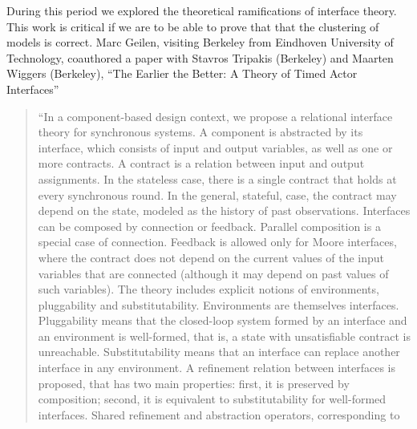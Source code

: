                During this period we explored the theoretical
               ramifications of interface theory.  This work is
               critical if we are to be able to prove that that the
               clustering of models is correct.  Marc Geilen, visiting
               Berkeley from Eindhoven University of Technology,
               coauthored a paper with Stavros Tripakis (Berkeley) and
               Maarten Wiggers (Berkeley), ``The Earlier the Better: A
               Theory of Timed Actor Interfaces''
               \cite{GeilenTripakisWiggers11_EarlierBetterTheoryOfTimedActorInterfaces}

               \begin{quotation}
                 ``In a component-based design context, we propose a
                 relational interface theory for synchronous systems. A
                 component is abstracted by its interface, which
                 consists of input and output variables, as well as one
                 or more contracts. A contract is a relation between
                 input and output assignments. In the stateless case,
                 there is a single contract that holds at every
                 synchronous round. In the general, stateful, case, the
                 contract may depend on the state, modeled as the
                 history of past observations. Interfaces can be
                 composed by connection or feedback. Parallel
                 composition is a special case of connection. Feedback
                 is allowed only for Moore interfaces, where the
                 contract does not depend on the current values of the
                 input variables that are connected (although it may
                 depend on past values of such variables). The theory
                 includes explicit notions of environments, pluggability
                 and substitutability. Environments are themselves
                 interfaces. Pluggability means that the closed-loop
                 system formed by an interface and an environment is
                 well-formed, that is, a state with unsatisfiable
                 contract is unreachable. Substitutability means that an
                 interface can replace another interface in any
                 environment. A refinement relation between interfaces
                 is proposed, that has two main properties: first, it is
                 preserved by composition; second, it is equivalent to
                 substitutability for well-formed interfaces. Shared
                 refinement and abstraction operators, corresponding to

\end{quotation}
